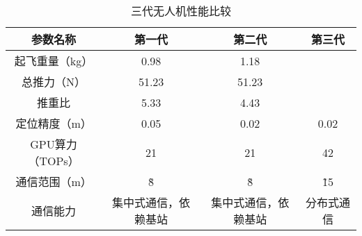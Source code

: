 \begin{table}[!ht]
    \centering
    \begin{tabular}{cccc}
    \hline
        参数名称 & 第一代 & 第二代 & 第三代 \\ \hline
        起飞重量（kg） & 0.98 & 1.18 & ~ \\ 
        总推力（N） & 51.23 & 51.23 & ~ \\ 
        推重比 & 5.33 & 4.43 & ~ \\ 
        定位精度（m） & 0.05 & 0.02 & 0.02 \\ 
        GPU算力（TOPs） & 21 & 21 & 42 \\ 
        通信范围（m） & \~8 & \~8 & \~15 \\ 
        通信能力 & 集中式通信，依赖基站 & 集中式通信，依赖基站 & 分布式通信 \\ \hline
    \end{tabular}
    \caption{三代无人机性能比较}
    \label{tab_hardware_cmp}
\end{table}

